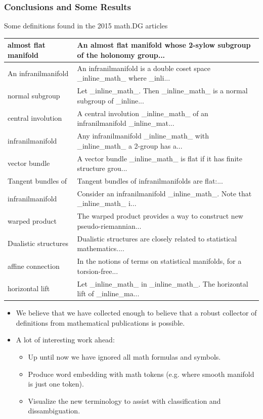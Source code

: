 \documentclass{beamer}
\begin{document}
\begin{frame} 
    \frametitle{Conclusions and Some Results}
    Some definitions found in the 2015 math.DG articles
    {\tiny\begin{tabular}{|l|l|}
        \hline
        almost flat manifold  &   An almost flat manifold whose 2-sylow subgroup of the holonomy group...\\
        \hline
        An infranilmanifold  &   An infranilmanifold is a double coset space \_inline\_math\_ where \_inli...\\
        \hline
        normal subgroup  &   Let \_inline\_math\_. Then \_inline\_math\_ is a normal subgroup of \_inline...\\
        \hline
        central involution  &   A central involution \_inline\_math\_ of an infranilmanifold \_inline\_mat...\\
        \hline
        infranilmanifold  &   Any infranilmanifold \_inline\_math\_ with \_inline\_math\_ a 2-group has a...\\
        \hline
        vector bundle  &   A vector bundle \_inline\_math\_ is flat if it has finite structure grou...\\
        \hline
        Tangent bundles of  &   Tangent bundles of infranilmanifolds are flat:...\\
        \hline
        infranilmanifold  &   Consider an infranilmanifold \_inline\_math\_. Note that \_inline\_math\_ i...\\
        \hline
        warped product  &   The warped product provides a way to construct new pseudo-riemannian...\\
        \hline
        Dualistic structures  &   Dualistic structures are closely related to statistical mathematics....\\
        \hline
        affine connection  &   In the notions of terms on statistical manifolds, for a torsion-free...\\
        \hline
        horizontal lift  &   Let \_inline\_math\_ in \_inline\_math\_. The horizontal lift of \_inline\_ma...\\
        \hline
    \end{tabular}}
    \begin{itemize}
            \item We believe that we have collected enough to believe that a robust collector of definitions from mathematical publications is possible.
            \item A lot of interesting work ahead:
                \begin{itemize}
                    \item Up until now we have ignored all math formulas and symbols.
                    \item Produce word embedding with math tokens (e.g. where smooth manifold is just one token).
                        \item Visualize the new terminology to assist with classification and dissambiguation.
                \end{itemize}
    \end{itemize}
\end{frame}
\begin{frame}
\titlepage
\end{frame}
\end{document}

